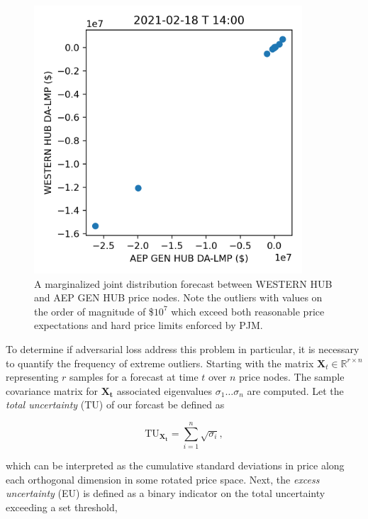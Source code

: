 \begin{figure}[htbp]
    \caption[Forecast joint distribution with extreme outliers]{
        A marginalized joint distribution forecast between WESTERN HUB and AEP GEN HUB price nodes.
        Note the outliers with values on the order of magnitude of \$$10^7$ which exceed both
        reasonable price expectations and hard price limits enforced by PJM.
    }
    \begin{center}
        \setlength{\fboxsep}{0pt}%
        \setlength{\fboxrule}{1pt}%
        \includegraphics[width=100mm]{figs/bad_samples}
    \end{center}
    \label{fig:badsamples}
\end{figure}

To determine if adversarial loss address this problem in particular, it is necessary to quantify the frequency of extreme
outliers.
Starting with the matrix $\mathbf{X}_t \in \mathbb{R}^{r \times n}$ representing $r$ samples for a forecast at time
$t$ over $n$ price nodes.
The sample covariance matrix for $\mathbf{X_t}$ associated eigenvalues ${\sigma_1 \dots \sigma_n}$ are computed.
Let the \textit{total uncertainty} (TU) of our forcast be defined as

\begin{equation*}
    \text{TU}_\mathbf{X_t} = \sum_{i=1}^{n} \sqrt{\sigma_i},
    \label{eq:total_uncertainty}
\end{equation*}

which can be interpreted as the cumulative standard deviations in price along each orthogonal dimension in some rotated
price space.
Next, the \textit{excess uncertainty} (EU) is defined as a binary indicator on the total uncertainty exceeding a set
threshold,

